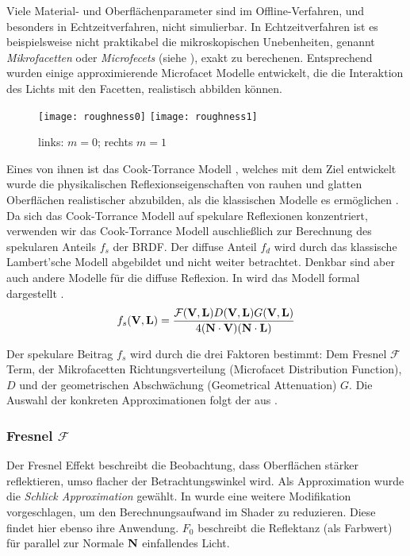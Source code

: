 Viele Material- und Oberflächenparameter sind im Offline-Verfahren, und besonders in Echtzeitverfahren, nicht simulierbar. In Echtzeitverfahren ist es beispielsweise nicht praktikabel die mikroskopischen Unebenheiten, genannt \textit{Mikrofacetten} oder \textit{Microfecets} (siehe ), exakt zu berechenen. Entsprechend wurden einige approximierende Microfacet Modelle entwickelt, die die Interaktion des Lichts mit den Facetten, realistisch abbilden können.

\begin{figure}
	\texttt{[image: roughness0]}
	\texttt{[image: roughness1]}
	\caption[Rauheit]{links: $m = 0$; rechts $m = 1$}\label{fig:microfacet}
\end{figure}

Eines von ihnen ist das Cook-Torrance Modell \parencite{Cook1981}, welches mit dem Ziel entwickelt wurde die physikalischen Reflexionseigenschaften von rauhen und glatten Oberflächen realistischer abzubilden, als die klassischen Modelle es ermöglichen \parencite[Seite 40]{Ngan2004}. Da sich das Cook-Torrance Modell auf spekulare Reflexionen konzentriert, verwenden wir das Cook-Torrance Modell auschließlich zur Berechnung des spekularen Anteils $f_s$ der BRDF. Der diffuse Anteil $f_d$ wird durch das klassische Lambert'sche Modell abgebildet und nicht weiter betrachtet. Denkbar sind aber auch andere Modelle für die diffuse Reflexion. In  wird das Modell formal dargestellt
.
\begin{align}
	\label{eq:cook-torrance-model}
	f_s(\mathbf V,\mathbf L) = \frac{\mathcal{F}(\mathbf V,\mathbf L)D(\mathbf V,\mathbf L)G(\mathbf V,\mathbf L)}{4(\mathbf N \cdot \mathbf V)(\mathbf N \cdot \mathbf L)}
\end{align}

Der spekulare Beitrag $f_s$ wird durch die drei Faktoren bestimmt: Dem Fresnel $\mathcal{F}$ Term, der Mikrofacetten Richtungsverteilung (Microfacet Distribution Function), $D$ und der geometrischen Abschwächung (Geometrical Attenuation) $G$. Die Auswahl der konkreten Approximationen folgt der aus \cite[Seite 3]{Karis2013}.

\subsubsection[Fresnel]{Fresnel $\mathcal{F}$}
Der Fresnel Effekt beschreibt die Beobachtung, dass Oberflächen stärker reflektieren, umso flacher der Betrachtungswinkel wird. Als Approximation wurde die \textit{Schlick Approximation} \parencite{Schlick1994} gewählt. In \cite{Lagarde2012} wurde eine weitere Modifikation vorgeschlagen, um den Berechnungsaufwand im Shader zu reduzieren. Diese findet hier ebenso ihre Anwendung. $F_0$ beschreibt die Reflektanz (als Farbwert) für parallel zur Normale $\mathbf N$ einfallendes Licht.

